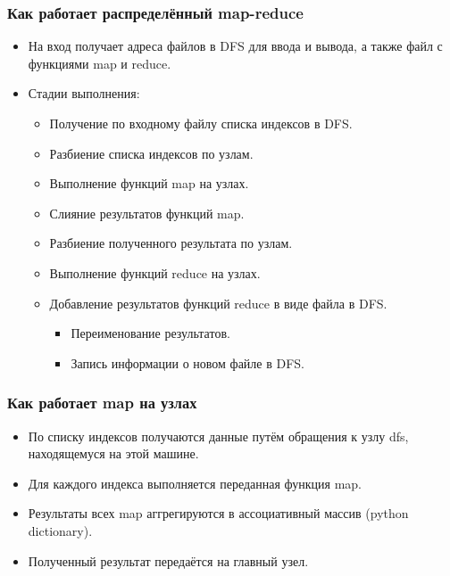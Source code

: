 \documentclass{beamer}
\begin{document}


    \begin{frame}
    \frametitle{Как работает распределённый map-reduce}
        \begin{itemize}
            \item На вход получает адреса файлов в DFS для ввода и вывода, а также файл с функциями map и reduce.
            \item Стадии выполнения:
            \begin{itemize}
                \item Получение по входному файлу списка индексов в DFS.
                \item Разбиение списка индексов по узлам.
                \item Выполнение функций map на узлах.
                \item Слияние результатов функций map.
                \item Разбиение полученного результата по узлам.
                \item Выполнение функций reduce на узлах.
                \item Добавление результатов функций reduce в виде файла в DFS.
                \begin{itemize}
                    \item Переименование результатов.
                    \item Запись информации о новом файле в DFS.
                \end{itemize} 
            \end{itemize} 
        \end{itemize}        
    \end{frame}


    \begin{frame}
    \frametitle{Как работает map на узлах}
        \begin{itemize}
            \item По списку индексов получаются данные путём обращения к узлу dfs, находящемуся на этой машине.
            \item Для каждого индекса выполняется переданная функция map.
            \item Результаты всех map аггрегируются в ассоциативный массив (python dictionary).
            \item Полученный результат передаётся на главный узел.
        \end{itemize}        
    \end{frame}
\end{document}
